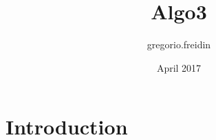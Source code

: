 \documentclass{article}
\title{Algo3}
\author{gregorio.freidin }
\date{April 2017}
\begin{document}
\maketitle

\section{Introduction}
\end{document}
